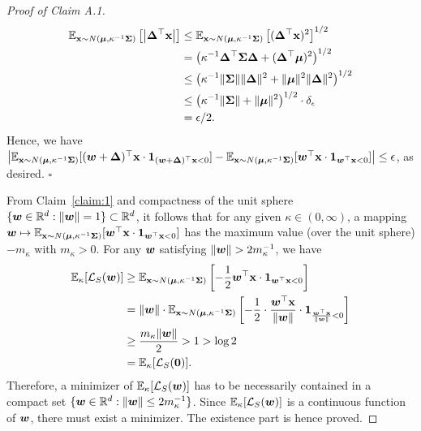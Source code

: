 \begin{proof}[Proof of Claim A.1]
\begin{align*}
    \mathbb{E}_{{\mathbf{x}} \sim N({\bm{\mu}}, \kappa^{-1} {\bm{\Sigma}})}\left[ \left| {\bm{\Delta}} ^\top {\mathbf{x}} \right| \right] &\leq \mathbb{E}_{{\mathbf{x}} \sim N({\bm{\mu}}, \kappa^{-1} {\bm{\Sigma}})}\left[ ({\bm{\Delta}} ^\top {\mathbf{x}})^2 \right]^{1/2}\\
    &= \left( \kappa^{-1} {\bm{\Delta}} ^\top {\bm{\Sigma}} {\bm{\Delta}} +({\bm{\Delta}}^\top {\bm{\mu}})^2 \right)^{1/2}\\
    &\leq \left(\kappa^{-1} \lVert {\bm{\Sigma}} \rVert \lVert {\bm{\Delta}} \rVert^2 + \lVert {\bm{\mu}}\rVert^2\lVert {\bm{\Delta}} \rVert^2 \right)^{1/2}\\
    &\leq \left(\kappa^{-1} \lVert {\bm{\Sigma}} \rVert + \lVert {\bm{\mu}}\rVert^2\right)^{1/2} \cdot \delta_\epsilon\\
    &= \epsilon/2.
\end{align*}
Hence, we have $\left | \mathbb{E}_{{\mathbf{x}} \sim N({\bm{\mu}}, \kappa^{-1} {\bm{\Sigma}})} [({\bm{w}}+{\bm{\Delta}})^\top {\mathbf{x}} \cdot {\bm{1}}_{({\bm{w}}+{\bm{\Delta}})^\top {\mathbf{x}}<0}]-\mathbb{E}_{{\mathbf{x}} \sim N({\bm{\mu}}, \kappa^{-1} {\bm{\Sigma}})} [{\bm{w}}^\top {\mathbf{x}} \cdot {\bm{1}}_{{\bm{w}}^\top {\mathbf{x}}<0}] \right| \leq \epsilon$, as desired. \hfill $\square$

From Claim~\ref{claim:1} and compactness of the unit sphere $\{ {\bm{w}}\in \mathbb{R}^d : \lVert {\bm{w}} \rVert = 1 \} \subset \mathbb{R}^d$, it follows that for any given $\kappa \in (0,\infty)$, a mapping ${\bm{w}} \mapsto \mathbb{E}_{{\mathbf{x}} \sim N({\bm{\mu}}, \kappa^{-1} {\bm{\Sigma}})} [{\bm{w}}^\top {\mathbf{x}} \cdot \mathbf{1}_{{\bm{w}}^\top {\mathbf{x}}<0}]$ has the maximum value (over the unit sphere) $-m_\kappa$ with $m_\kappa >0$. For any ${\bm{w}}$ satisfying $\lVert {\bm{w}} \rVert > 2 m_\kappa^{-1}$, we have
\begin{align}\label{eqn:ball}
    \mathbb{E}_\kappa[\mathcal{L}_S ({\bm{w}})] &\geq \mathbb{E}_{{\mathbf{x}} \sim N({\bm{\mu}}, \kappa^{-1} {\bm{\Sigma}})}\left[- \frac{1}{2} {\bm{w}}^\top {\mathbf{x}} \cdot {\bm{1}}_{{\bm{w}}^\top {\mathbf{x}}<0} \right] \nonumber \\
    &= \lVert {\bm{w}} \rVert \cdot \mathbb{E}_{{\mathbf{x}} \sim N({\bm{\mu}}, \kappa^{-1}{\bm{\Sigma}})}\left[- \frac{1}{2} \cdot \frac{{\bm{w}}^\top {\mathbf{x}}}{\lVert {\bm{w}} \rVert}\cdot {\bm{1}}_{\frac{{\bm{w}}^\top {\mathbf{x}}}{\lVert {\bm{w}} \rVert}<0} \right]\\
    &\geq \frac{m_\kappa \lVert {\bm{w}} \rVert}{2} 
    > 1 > \log 2 \nonumber\\
    &= \mathbb{E}_\kappa[\mathcal{L}_S({\bm{0}})] \nonumber.
\end{align}
Therefore, a minimizer of $\mathbb{E}_\kappa [ \mathcal{L}_S ({\bm{w}}) ]$ has to be necessarily contained in a compact set $\{ {\bm{w}} \in \mathbb{R}^d :  \lVert {\bm{w}} \rVert \leq 2  m_\kappa^{-1} \}$. Since $\mathbb{E}_\kappa [ \mathcal{L}_S ({\bm{w}}) ]$ is a continuous function of ${\bm{w}}$, there must exist a minimizer. The existence part is hence proved.


\end{proof}
